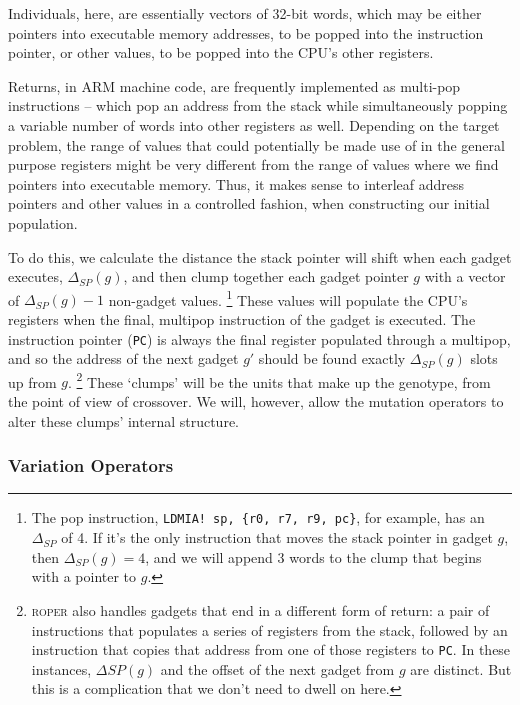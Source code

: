 Individuals, here, are essentially vectors of 32-bit words, which
may be either pointers into executable memory addresses, 
to be popped into the instruction pointer, or other values, 
to be popped into the CPU's other registers. 

Returns, in ARM machine code, are frequently implemented as multi-pop
instructions -- which pop an address from the stack while
simultaneously popping a variable number of words into other registers
as well. Depending on the target problem, the range of values that
could potentially be made use of in the general purpose registers
might be very different from the range of values where we find
pointers into executable memory. Thus, it makes sense to interleaf
address pointers and other values in a controlled fashion, when
constructing our initial population.

To do this, we calculate the distance the stack pointer will shift
when each gadget executes, $\Delta_{SP}(g)$, and then clump
together each gadget pointer $g$ with a vector of
$\Delta_{SP}(g)-1$ non-gadget values.
\footnote{The pop instruction, \texttt{LDMIA! sp, \{r0, r7, 
  r9, pc\}},
  for example, has an $\Delta_{SP}$ of 4. If it's the only
  instruction that moves the stack pointer in gadget $g$, then
  $\Delta_{SP}(g) = 4$, and we will append 3 words to the clump
  that begins with a pointer to $g$.}
These values will populate
the CPU's registers when the final, multipop instruction of the
gadget is executed. The instruction pointer (\texttt{PC}) is always
the final register populated through a multipop, and so the
address of the next gadget $g'$ should be found exactly
$\Delta_{SP}(g)$ slots up from $g$.%
\footnote{\textsc{roper} also handles gadgets that end in a different
  form of return: a pair of instructions that populates a series
  of registers from the stack, followed by an instruction that
  copies that address from one of those registers to \texttt{PC}.
  In these instances, $\Delta{SP}(g)$ and the offset of the next
  gadget from $g$ are distinct. But this is a complication that
  we don't need to dwell on here.}
These `clumps' will be the units that make up the genotype,
from the point of view of crossover. We will,
however, allow the mutation operators to alter these clumps' internal structure. 


\subsubsection{Variation Operators}
